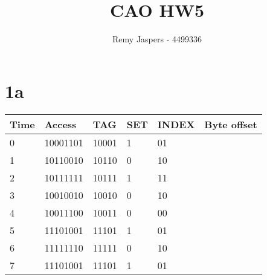 \documentclass[10pt,a4paper]{article}
\author{Remy Jaspers - 4499336}
\title{CAO HW5}
\begin{document}
	\maketitle
	\section*{1a}
\begin{table}[h]
	\centering
	\label{my-label}
	\begin{tabular}{|l|l|l|l|l|l|}
		\hline
		Time & Access  & TAG  & SET  & INDEX  & Byte offset  \\ \hline
		0& 10001101 & 10001 &  1  & 01 & \\ \hline
		1& 10110010 & 10110 &  0 & 10 &  \\ \hline
		2& 10111111 & 10111 &  1 & 11& \\ \hline
		3& 10010010 & 10010 &  0 & 10 &\\ \hline
		4& 10011100 & 10011 &  0 & 00 &\\ \hline
		5& 11101001 & 11101 &  1 & 01 &\\ \hline
		6& 11111110 & 11111 &  0 & 10 &\\ \hline
		7& 11101001 & 11101 &  1 & 01 &\\ \hline
	\end{tabular}
\end{table}
\end{document}

